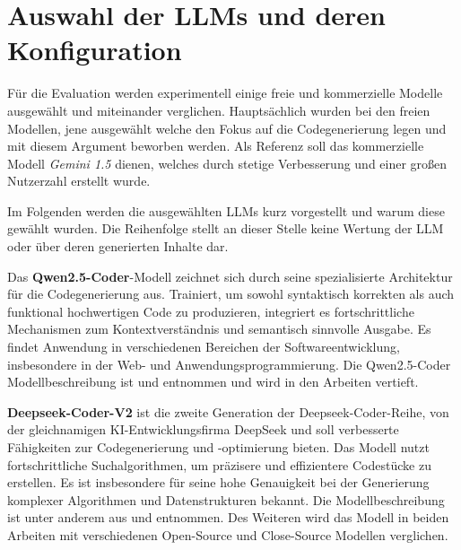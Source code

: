 


\section{Auswahl der LLMs und deren Konfiguration}\label{subsec:llm_selection}

Für die Evaluation werden experimentell einige freie und kommerzielle Modelle ausgewählt und miteinander verglichen. Hauptsächlich wurden bei den freien Modellen, jene ausgewählt welche den Fokus auf die Codegenerierung legen und mit diesem Argument beworben werden. Als Referenz soll das kommerzielle Modell \textit{Gemini 1.5} dienen, welches durch stetige Verbesserung und einer großen Nutzerzahl erstellt wurde.\vspace{0.2cm}

Im Folgenden werden die ausgewählten LLMs kurz vorgestellt und warum diese gewählt wurden. Die Reihenfolge stellt an dieser Stelle keine Wertung der LLM oder über deren generierten Inhalte dar.\vspace{0.2cm}

Das \textbf{Qwen2.5-Coder}-Modell zeichnet sich durch seine spezialisierte Architektur für die Codegenerierung aus. Trainiert, um sowohl syntaktisch korrekten als auch funktional hochwertigen Code zu produzieren, integriert es fortschrittliche Mechanismen zum Kontextverständnis und semantisch sinnvolle Ausgabe. Es findet Anwendung in verschiedenen Bereichen der Softwareentwicklung, insbesondere in der Web- und Anwendungsprogrammierung. Die Qwen2.5-Coder Modellbeschreibung ist \cite{qwen-2024} und \cite{hui-2024} entnommen und wird in den Arbeiten vertieft.\vspace{0.2cm}

\textbf{Deepseek-Coder-V2} ist die zweite Generation der Deepseek-Coder-Reihe, von der gleichnamigen KI-Entwicklungsfirma DeepSeek und soll verbesserte Fähigkeiten zur Codegenerierung und -optimierung bieten. Das Modell nutzt fortschrittliche Suchalgorithmen, um präzisere und effizientere Codestücke zu erstellen. Es ist insbesondere für seine hohe Genauigkeit bei der Generierung komplexer Algorithmen und Datenstrukturen bekannt. Die Modellbeschreibung ist unter anderem aus \cite{deepseek-ai-2024} und \cite{cui-2024} entnommen. Des Weiteren wird das Modell in beiden Arbeiten mit verschiedenen Open-Source und Close-Source Modellen verglichen.\vspace{0.2cm} 


